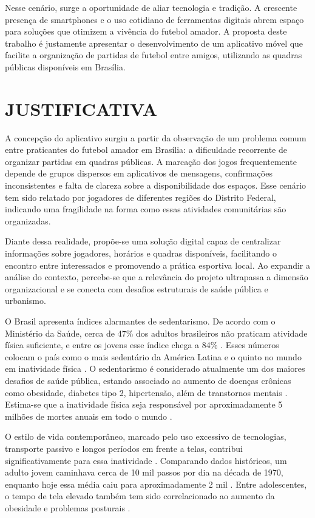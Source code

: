 Nesse cenário, surge a oportunidade de aliar tecnologia e tradição. A crescente presença de smartphones e o uso cotidiano de ferramentas digitais abrem espaço para soluções que otimizem a vivência do futebol amador. A proposta deste trabalho é justamente apresentar o desenvolvimento de um aplicativo móvel que facilite a organização de partidas de futebol entre amigos, utilizando as quadras públicas disponíveis em Brasília.

\section{JUSTIFICATIVA}

A concepção do aplicativo surgiu a partir da observação de um problema comum entre praticantes do futebol amador em Brasília: a dificuldade recorrente de organizar partidas em quadras públicas. A marcação dos jogos frequentemente depende de grupos dispersos em aplicativos de mensagens, confirmações inconsistentes e falta de clareza sobre a disponibilidade dos espaços. Esse cenário tem sido relatado por jogadores de diferentes regiões do Distrito Federal, indicando uma fragilidade na forma como essas atividades comunitárias são organizadas.

Diante dessa realidade, propõe-se uma solução digital capaz de centralizar informações sobre jogadores, horários e quadras disponíveis, facilitando o encontro entre interessados e promovendo a prática esportiva local. Ao expandir a análise do contexto, percebe-se que a relevância do projeto ultrapassa a dimensão organizacional e se conecta com desafios estruturais de saúde pública e urbanismo.

O Brasil apresenta índices alarmantes de sedentarismo. De acordo com o Ministério da Saúde, cerca de 47\% dos adultos brasileiros não praticam atividade física suficiente, e entre os jovens esse índice chega a 84\% \cite{ministerio2023,saraiva2024}. Esses números colocam o país como o mais sedentário da América Latina e o quinto no mundo em inatividade física \cite{oms2023,bvsms2023}. O sedentarismo é considerado atualmente um dos maiores desafios de saúde pública, estando associado ao aumento de doenças crônicas como obesidade, diabetes tipo 2, hipertensão, além de transtornos mentais \cite{bvsms2023,oms2023}. Estima-se que a inatividade física seja responsável por aproximadamente 5 milhões de mortes anuais em todo o mundo \cite{oms2023}.

O estilo de vida contemporâneo, marcado pelo uso excessivo de tecnologias, transporte passivo e longos períodos em frente a telas, contribui significativamente para essa inatividade \cite{saraiva2024}. Comparando dados históricos, um adulto jovem caminhava cerca de 10 mil passos por dia na década de 1970, enquanto hoje essa média caiu para aproximadamente 2 mil \cite{saraiva2024}. Entre adolescentes, o tempo de tela elevado também tem sido correlacionado ao aumento da obesidade e problemas posturais \cite{saraiva2024}.

